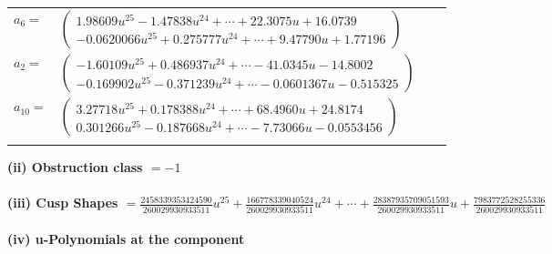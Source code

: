 \documentclass[1p]{elsarticle_modified}
\theoremstyle{definition}
\begin{document}
\begin{tabular}{m{7pt} m{180pt} m{7pt} m{180pt} }
\flushright $a_{6}=$&$\begin{pmatrix}1.98609 u^{25}-1.47838 u^{24}+\cdots+22.3075 u+16.0739\\-0.0620066 u^{25}+0.275777 u^{24}+\cdots+9.47790 u+1.77196\end{pmatrix}$ \\
\flushright $a_{2}=$&$\begin{pmatrix}-1.60109 u^{25}+0.486937 u^{24}+\cdots-41.0345 u-14.8002\\-0.169902 u^{25}-0.371239 u^{24}+\cdots-0.0601367 u-0.515325\end{pmatrix}$ \\
\flushright $a_{10}=$&$\begin{pmatrix}3.27718 u^{25}+0.178388 u^{24}+\cdots+68.4960 u+24.8174\\0.301266 u^{25}-0.187668 u^{24}+\cdots-7.73066 u-0.0553456\end{pmatrix}$\\&\end{tabular}
\flushleft \textbf{(ii) Obstruction class $= -1$}\\~\\
\flushleft \textbf{(iii) Cusp Shapes $= \frac{2458339353424590}{260029930933511} u^{25}+\frac{166778339040524}{260029930933511} u^{24}+\cdots+\frac{28387935709051593}{260029930933511} u+\frac{7983772528255336}{260029930933511}$}\\~\\
\newpage\renewcommand{\arraystretch}{1}
\flushleft \textbf{(iv) u-Polynomials at the component}\newline \\
\end{document}
